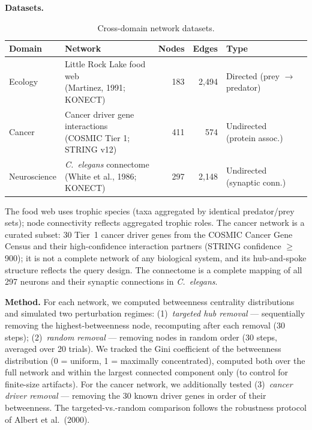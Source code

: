 \documentclass[12pt,a4paper]{article}
\begin{document}
\textbf{Datasets.}

\begin{table}[htbp]
\centering
\small
\begin{tabular}{@{}llrrl@{}}
\toprule
Domain & Network & Nodes & Edges & Type \\
\midrule
Ecology & \makecell[l]{Little Rock Lake food web \\ (Martinez, 1991; KONECT)} & 183 & 2,494 & \makecell[l]{Directed \\ (prey $\to$ predator)} \\[6pt]
Cancer & \makecell[l]{Cancer driver gene interactions \\ (COSMIC Tier 1; STRING v12)} & 411 & 574 & \makecell[l]{Undirected \\ (protein assoc.)} \\[6pt]
Neuroscience & \makecell[l]{\textit{C.~elegans} connectome \\ (White et al., 1986; KONECT)} & 297 & 2,148 & \makecell[l]{Undirected \\ (synaptic conn.)} \\
\bottomrule
\end{tabular}
\caption{Cross-domain network datasets.}
\label{tab:datasets}
\end{table}

The food web uses trophic species (taxa aggregated by identical predator/prey sets); node connectivity reflects aggregated trophic roles. The cancer network is a curated subset: 30 Tier~1 cancer driver genes from the COSMIC Cancer Gene Census and their high-confidence interaction partners (STRING confidence $\geq$ 900); it is not a complete network of any biological system, and its hub-and-spoke structure reflects the query design. The connectome is a complete mapping of all 297 neurons and their synaptic connections in \textit{C.~elegans}.

\textbf{Method.} For each network, we computed betweenness centrality distributions and simulated two perturbation regimes: (1)~\emph{targeted hub removal} --- sequentially removing the highest-betweenness node, recomputing after each removal (30 steps); (2)~\emph{random removal} --- removing nodes in random order (30 steps, averaged over 20 trials). We tracked the Gini coefficient of the betweenness distribution (0 = uniform, 1 = maximally concentrated), computed both over the full network and within the largest connected component only (to control for finite-size artifacts). For the cancer network, we additionally tested (3)~\emph{cancer driver removal} --- removing the 30 known driver genes in order of their betweenness. The targeted-vs.-random comparison follows the robustness protocol of Albert et al.\ (2000).
\end{document}
